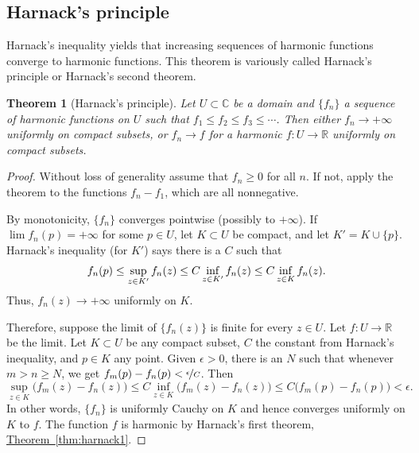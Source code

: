 \documentclass[12pt,openany]{book}
\newcommand{\avoidbreak}{\postdisplaypenalty=100}
\newcommand{\C}{{\mathbb{C}}}
\newcommand{\R}{{\mathbb{R}}}
\theoremstyle{plain}
\newtheorem{thm}{Theorem}[section]
\theoremstyle{remark}
\theoremstyle{definition}
\theoremstyle{exercise}
\theoremstyle{example}
\newcommand{\thmref}[1]{\hyperref[#1]{Theorem~\ref*{#1}}}
\begin{document}
\subsection{Harnack's principle}

Harnack's inequality yields that increasing 
sequences of harmonic functions converge to harmonic functions.
This theorem is variously called
Harnack's principle or Harnack's second theorem.

\begin{thm}[Harnack's principle]
Let $U \subset \C$ be a domain and $\{ f_n \}$ a sequence of
harmonic functions on $U$ such that $f_1 \leq f_2 \leq f_3 \leq \cdots$.
Then either $f_n \to +\infty$ uniformly on compact subsets, or
$f_n \to f$ for a harmonic $f \colon U \to \R$ uniformly on compact subsets.
\end{thm}

\begin{proof}
Without loss of generality assume that $f_n \geq 0$ for all $n$.
If not, apply the theorem to the functions $f_n-f_1$,
which are all nonnegative.

By monotonicity, $\{f_n\}$ converges pointwise (possibly to $+\infty$).
If $\lim f_n(p) = +\infty$ for some $p \in U$, let $K \subset U$
be compact, and let $K' = K \cup \{ p \}$.
Harnack's inequality (for $K'$) says there is a $C$ such that
\begin{equation*}
f_n(p) \leq \sup_{z \in K'} f_n(z) \leq C \inf_{z\in K'} f_n(z) \leq C \inf_{z\in K} f_n(z) .
\avoidbreak
\end{equation*}
Thus, $f_n(z) \to +\infty$ uniformly on $K$.

Therefore, suppose the limit of $\{ f_n(z) \}$ is finite
for every $z \in U$.  Let $f \colon U \to \R$ be the limit.
Let $K \subset U$ be any compact subset,
$C$ the constant from Harnack's inequality, and $p \in K$ any point.
Given $\epsilon > 0$,
there is an $N$
such that whenever $m > n \geq N$, we get
$f_m(p)-f_n(p) < \nicefrac{\epsilon}{C}$.  Then
\begin{equation*}
\sup_{z \in K} \bigl( f_m(z)- f_n(z) \bigr) \leq
C \inf_{z\in K} \bigl( f_m(z)-f_n(z) \bigr)
\leq
C \bigl( f_m(p)-f_n(p) \bigr)
< \epsilon .
\end{equation*}
In other words, $\{ f_n \}$ is uniformly Cauchy on $K$ and hence converges
uniformly on $K$ to $f$.  The function $f$ is harmonic by
Harnack's first theorem, 
\thmref{thm:harnack1}.
\end{proof}
\end{document}
